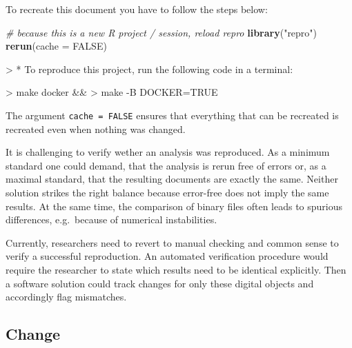 \documentclass[12pt,a4paper,twoside]{article}
\newenvironment{Shaded}{\begin{snugshade}}{\end{snugshade}}
\newcommand{\CommentTok}[1]{\textcolor[rgb]{0.56,0.35,0.01}{\textit{#1}}}
\newcommand{\DataTypeTok}[1]{\textcolor[rgb]{0.13,0.29,0.53}{#1}}
\newcommand{\KeywordTok}[1]{\textcolor[rgb]{0.13,0.29,0.53}{\textbf{#1}}}
\newcommand{\NormalTok}[1]{#1}
\newcommand{\OtherTok}[1]{\textcolor[rgb]{0.56,0.35,0.01}{#1}}
\newcommand{\StringTok}[1]{\textcolor[rgb]{0.31,0.60,0.02}{#1}}
\let\oldverbatim\verbatim
\let\endoldverbatim\endverbatim
\renewenvironment{verbatim}{\footnotesize\oldverbatim}{\endoldverbatim}
\begin{document}
To recreate this document you have to follow the steps below:

\begin{Shaded}
\begin{Highlighting}[]
\CommentTok{# because this is a new R project / session, reload repro}
\KeywordTok{library}\NormalTok{(}\StringTok{"repro"}\NormalTok{)}
\KeywordTok{rerun}\NormalTok{(}\DataTypeTok{cache =} \OtherTok{FALSE}\NormalTok{)}
\end{Highlighting}
\end{Shaded}

\begin{verbatim}
> * To reproduce this project, run the following code in a terminal:
\end{verbatim}

\begin{verbatim}
>   make docker &&
>   make -B DOCKER=TRUE
\end{verbatim}

The argument \texttt{cache\ =\ FALSE} ensures that everything that can be recreated is recreated even when nothing was changed.

It is challenging to verify wether an analysis was reproduced.
As a minimum standard one could demand, that the analysis is rerun free of errors or, as a maximal standard, that the resulting documents are exactly the same.
Neither solution strikes the right balance because error-free does not imply the same results.
At the same time, the comparison of binary files often leads to spurious differences, e.g.~because of numerical instabilities.

Currently, researchers need to revert to manual checking and common sense to verify a successful reproduction.
An automated verification procedure would require the researcher to state which results need to be identical explicitly.
Then a software solution could track changes for only these digital objects and accordingly flag mismatches.

\hypertarget{change}{%
\subsection{Change}\label{change}}
\end{document}
